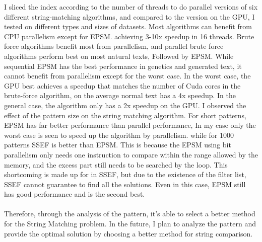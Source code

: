 \documentclass[11pt]{article}       %
\newcommand{\includeFig}[3]      {\begin{figure}[htb] \begin{center}
                                 \includegraphics
                                 [width=4in,keepaspectratio] %
                                 {#2}\caption{\label{#1}#3} \end{center} \end{figure}}
\begin{document}
I sliced the index according to the number of threads to do parallel versions of six different string-matching algorithms, and compared to the version on the GPU, I tested on different types and sizes of datasets.  Most algorithms can benefit from CPU parallelism except for EPSM. achieving 3-10x speedup in 16 threads. Brute force algorithms benefit most from parallelism, and parallel brute force algorithms perform best on most natural texts, Followed by EPSM. While sequential EPSM has the best performance in genetics and generated text, it cannot benefit from parallelism except for the worst case. In the worst case, the GPU best achieves a speedup that matches the number of Cuda cores in the brute-force algorithm, on the average normal text has a 4x speedup. In the general case, the algorithm only has a 2x speedup on the GPU. I observed the effect of the pattern size on the string matching algorithm. For short patterns, EPSM has far better performance than parallel performance, In my case only the worst case is seen to speed up the algorithm by parallelism. while for 1000 patterns SSEF is better than EPSM. This is because the EPSM using bit parallelism only needs one instruction to compare within the range allowed by the memory, and the excess part still needs to be searched by the loop. This shortcoming is made up for in SSEF, but due to the existence of the filter list, SSEF cannot guarantee to find all the solutions. Even in this case, EPSM still has good performance and is the second best.\\
\\Therefore, through the analysis of the pattern, it's able to select a better method for the String Matching problem. In the future, I plan to analyze the pattern and provide the optimal solution by choosing a better method for string comparison.













\end{document}
